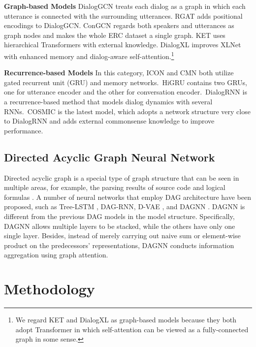 \documentclass[11pt,a4paper]{article}
\begin{document}
\noindent \textbf{Graph-based Models}
DialogGCN \citep{ghosal2019dialoguegcn} treats each dialog as a graph in which each utterance is connected with the surrounding utterances. RGAT \citep{ishiwatari2020relation} adds positional encodings to DialogGCN. ConGCN \citep{zhang2019modeling} regards both speakers and utterances as graph nodes and makes the whole ERC dataset a single graph. KET \citep{zhong2019knowledge} uses hierarchical Transformers \citep{vaswani2017attention} with external knowledge. DialogXL \citep{shen2020dialogxl} improves XLNet \cite{yang2019xlnet} with enhanced memory and dialog-aware self-attention.\footnote{We regard KET and DialogXL as graph-based models because they both adopt Transformer in which self-attention can be viewed as a fully-connected graph in some sense.}

\noindent \textbf{Recurrence-based Models} In this category, ICON \citep{hazarika2018icon} and CMN \cite{hazarika2018conversational} both utilize gated recurrent unit (GRU) and memory networks.~HiGRU \citep{jiao2019higru} contains two GRUs, one for utterance encoder and the other for conversation encoder.~DialogRNN \citep{majumder2019dialoguernn} is a recurrence-based method that models dialog dynamics with several RNNs.~COSMIC \citep{ghosal2020cosmic} is the latest model, which adopts a network structure very close to DialogRNN and adds external commonsense knowledge to improve performance.


\subsection{Directed Acyclic Graph Neural Network} 

Directed acyclic graph is a special type of graph structure that can be seen in multiple areas, for example, the parsing results of source code \cite{allamanis2018survey} and logical formulas \citep{crouse2019improving}. A number of neural networks that employ DAG architecture have been proposed, such as Tree-LSTM \citep{tai2015improved}, DAG-RNN\citep{shuai2016dag}, D-VAE \citep{zhang2019d}, and DAGNN \citep{thost2021directed}. 
DAGNN is different from the previous DAG models in the model structure.
Specifically, DAGNN allows multiple layers to be stacked, while the others have only one single layer. Besides, instead of merely carrying out naive sum or element-wise product on the predecessors' representations, DAGNN conducts information aggregation using graph attention.

\section{Methodology} 
\end{document}
